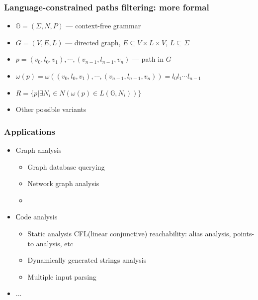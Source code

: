 \documentclass{beamer}
\begin{document}
\begin{frame}[fragile]
  \transwipe[direction=90]
  \frametitle{Language-constrained paths filtering: more formal}
  \begin{itemize}
    \item $\mathbb{G} = (\Sigma, N, P)$ --- context-free grammar
    \item $G = (V,E,L)$ --- directed graph, $E \subseteq V\times L \times V$, $L\subseteq \Sigma$
    \item $p=(v_0,l_0,v_1),\cdots,(v_{n-1},l_{n-1},v_n)$ --- path in $G$
    \item $\omega(p) = \omega((v_0,l_0,v_1),\cdots,(v_{n-1},l_{n-1},v_n)) = l_0 l_1 \cdots l_{n-1}$
    \item $R = \{ p | \exists N_i \in N (\omega(p) \in L(\mathbb{G},N_i))\}$
    \item Other possible variants

  \end{itemize}
\end{frame}

\begin{frame}[fragile]
  \transwipe[direction=90]
  \frametitle{Applications}
  \begin{itemize}
    \item Graph analysis
    \begin{itemize}
      \item Graph database querying
      \item Network graph analysis
      \item  
    \end{itemize}
    \item Сode analysis
    \begin{itemize}
      \item Static analysis CFL(linear conjunctive) reachability: alias analysis, points-to analysis, etc
      \item Dynamically generated strings analysis
      \item Multiple input parsing 
    \end{itemize}
    \item ...
  \end{itemize}
\end{frame}
\end{document}
